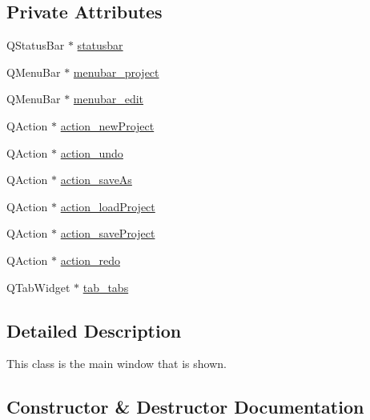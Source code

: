 \subsection*{Private Attributes}
\begin{DoxyCompactItemize}
\item 
Q\+Status\+Bar $\ast$ \hyperlink{classGUI_1_1MainWindow_ab12bbb712331d72b3972876494b01d43}{statusbar}
\item 
Q\+Menu\+Bar $\ast$ \hyperlink{classGUI_1_1MainWindow_a3a7fd0d9d9fcaf5f23b620ecc1d868a2}{menubar\+\_\+project}
\item 
Q\+Menu\+Bar $\ast$ \hyperlink{classGUI_1_1MainWindow_a5beda12aa8191deaad381531b99992f8}{menubar\+\_\+edit}
\item 
Q\+Action $\ast$ \hyperlink{classGUI_1_1MainWindow_a5cf13e75b97a8a55f79a7f1a5dfeccdd}{action\+\_\+new\+Project}
\item 
Q\+Action $\ast$ \hyperlink{classGUI_1_1MainWindow_af4ed54c2c44d393a4c854ca626103f72}{action\+\_\+undo}
\item 
Q\+Action $\ast$ \hyperlink{classGUI_1_1MainWindow_a477f9c21e430c9db3664df4ac4a5bec9}{action\+\_\+save\+As}
\item 
Q\+Action $\ast$ \hyperlink{classGUI_1_1MainWindow_acbc3dfeebc15f93a7808e5a1d7a44492}{action\+\_\+load\+Project}
\item 
Q\+Action $\ast$ \hyperlink{classGUI_1_1MainWindow_a84cc9a3cf59e2fdd3196da97a5faa717}{action\+\_\+save\+Project}
\item 
Q\+Action $\ast$ \hyperlink{classGUI_1_1MainWindow_a76bce8131d4330008b0f40cf8e8b97d6}{action\+\_\+redo}
\item 
Q\+Tab\+Widget $\ast$ \hyperlink{classGUI_1_1MainWindow_aaeb8f9f47ba45615e767b2a7f7b009d9}{tab\+\_\+tabs}
\end{DoxyCompactItemize}


\subsection{Detailed Description}
This class is the main window that is shown. 

\subsection{Constructor \& Destructor Documentation}
\hypertarget{classGUI_1_1MainWindow_aafaf72c52e0a059620d80026737865b4}{}
